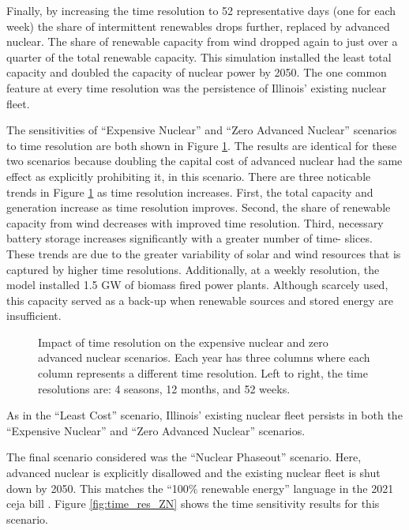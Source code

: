 Finally, by increasing the time resolution to 52 representative days (one for
each week) the share of intermittent renewables drops further, replaced by
advanced nuclear. The share of renewable capacity from wind dropped again to
just over a quarter of the total renewable capacity. This simulation installed
the least total capacity and doubled the capacity of nuclear power by 2050.
The one common feature at every time resolution was the persistence of Illinois'
existing nuclear fleet.

The sensitivities of ``Expensive Nuclear'' and ``Zero Advanced Nuclear'' scenarios
to time resolution are both shown in Figure \ref{fig:time_res_ZAN}. The results
are identical for these two scenarios because doubling the capital cost of
advanced nuclear had the same effect as explicitly prohibiting it, in this scenario.
There are three noticable trends in Figure \ref{fig:time_res_ZAN} as time resolution
increases. First, the total capacity and generation increase as time resolution improves.
Second, the share of renewable capacity from wind decreases with improved time resolution.
Third, necessary battery storage increases significantly with a greater number of time-
slices. These trends are due to the greater variability of solar and wind resources that is
captured by higher time resolutions. Additionally, at a weekly resolution, the
model installed 1.5 GW of biomass fired power plants. Although scarcely used,
this capacity served as a back-up when renewable sources and stored energy are
insufficient.

\begin{figure}[H]
  \centering
  \resizebox{0.95\columnwidth}{!}{}
  \caption{Impact of time resolution on the expensive nuclear and zero advanced nuclear
  scenarios. Each year has three columns where each column represents a different time
  resolution. Left to right, the time resolutions are: 4 seasons, 12 months, and 52 weeks.}
  \label{fig:time_res_ZAN}
\end{figure}

As in the ``Least Cost'' scenario, Illinois' existing nuclear fleet persists in
both the ``Expensive Nuclear'' and ``Zero Advanced Nuclear'' scenarios.

The final scenario considered was the ``Nuclear Phaseout'' scenario. Here, advanced
nuclear is explicitly disallowed and the existing nuclear fleet is shut down by
2050. This matches the ``100\% renewable energy'' language in the 2021 \gls{ceja} bill
\cite{harmon_climate_2021}. Figure \ref{fig:time_res_ZN} shows the time sensitivity
results for this scenario.

